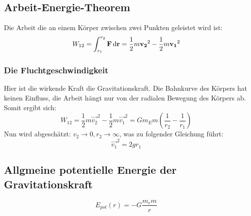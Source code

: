 \subsection{Arbeit-Energie-Theorem}
Die Arbeit die an einem Körper zwischen zwei Punkten geleistet wird ist:
\begin{equation}
W_{12} = \int_{r_1}^{r_2} \mathbf{F} \,\mathrm{d} \mathbf{r} = \frac{1}{2}m\mathbf{v_2}^2 - \frac{1}{2}m \mathbf{v_1}^2
\end{equation}
\subsubsection{Die Fluchtgeschwindigkeit}
Hier ist die wirkende Kraft die Gravitationskraft. Die Bahnkurve des Körpers hat keinen Einfluss, die Arbeit hängt nur von der radialen Bewegung des Körpers ab. Somit ergibt sich:
\begin{equation}
W_{12} = \frac{1}{2}m\vec{v_2}^2 - \frac{1}{2}m \vec{v_1}^2 = G m_E m \left( \frac{1}{r_2} - \frac{1}{r_1} \right)
\end{equation}
Nun wird abgeschätzt: $v_2 \to 0, r_2 \to \infty$, was zu folgender Gleichung führt:
\begin{equation}
\vec{v_1}^2 = 2 g r_1
\end{equation}
\subsection{Allgmeine potentielle Energie der Gravitationskraft}
\begin{equation}
E_{pot}(r) = - G \frac{m_e m}{r}
\end{equation}